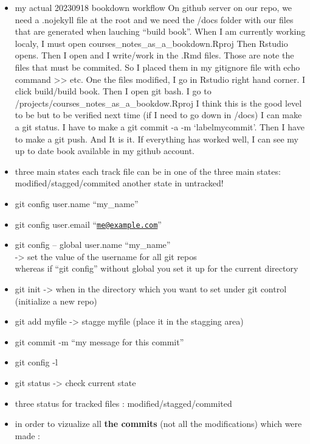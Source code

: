\documentclass[
]{book}
\begin{document}
\begin{itemize}
\item
  my actual 20230918 bookdown workflow
  On github server on our repo, we need a .nojekyll file at the root
  and we need the /docs folder with our files that are generated when lauching
  ``build book''.
  When I am currently working localy, I must open courses\_notes\_as\_a\_bookdown.Rproj
  Then Rstudio opens. Then I open and I write/work in the .Rmd files.
  Those are note the files that must be commited. So I placed them in my gitignore file with echo command \textgreater\textgreater{} etc.
  One the files modified, I go in Rstudio right hand corner. I click build/build book.
  Then I open git bash. I go to /projects/courses\_notes\_as\_a\_bookdow.Rproj
  I think this is the good level to be but to be verified next time (if I need to go down in /docs)
  I can make a git status. I have to make a git commit -a -m `labelmycommit'.
  Then I have to make a git push.
  And It is it. If everything has worked well, I can see my up to date book available in my github account.
\item
  three main states
  each track file can be in one of the three main states: modified/stagged/commited
  another state in untracked!
\item
  git config user.name ``my\_name''
\item
  git config user.email ``\href{mailto:me@example.com}{\nolinkurl{me@example.com}}''
\item
  git config -- global user.name ``my\_name''\\
  -\textgreater{} set the value of the username for all git repos\\
  whereas if ``git config'' without global you set it up for the current directory
\item
  git init -\textgreater{} when in the directory which you want to set under git control (initialize a new repo)
\item
  git add myfile -\textgreater{} stagge myfile (place it in the stagging area)
\item
  git commit -m ``my message for this commit''
\item
  git config -l
\item
  git status -\textgreater{} check current state
\item
  three status for tracked files : modified/stagged/commited
\item
  in order to vizualize all \textbf{the commits} (not all the modifications) which were made :\\

\end{itemize}
\end{document}
